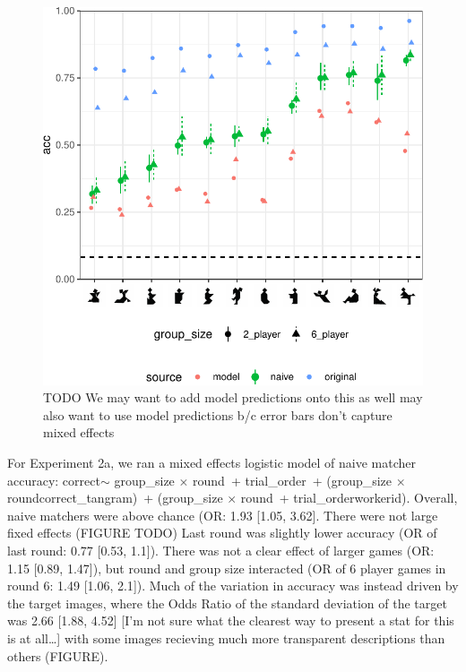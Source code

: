 \documentclass[10pt, letterpaper]{article}
\begin{document}
\begin{CodeChunk}
\begin{figure}[t]

{\centering \includegraphics[width=1\linewidth]{figs/fig-2-1} 

}

\caption[TODO We may want to add model predictions onto this as well may also want to use model predictions b/c error bars don't capture mixed effects \label{TODO2}]{TODO We may want to add model predictions onto this as well may also want to use model predictions b/c error bars don't capture mixed effects \label{TODO2}}\label{fig:fig-2}
\end{figure}
\end{CodeChunk}

For Experiment 2a, we ran a mixed effects logistic model of naive
matcher accuracy: correct\(\sim\) group\_size \(\times\) round~+
trial\_order~+ (group\_size \(\times\) round\textbar correct\_tangram)~+
(group\_size \(\times\) round~+ trial\_order\textbar workerid). Overall,
naive matchers were above chance (OR: 1.93 {[}1.05, 3.62{]}. There were
not large fixed effects (FIGURE TODO) Last round was slightly lower
accuracy (OR of last round: 0.77 {[}0.53, 1.1{]}). There was not a clear
effect of larger games (OR: 1.15 {[}0.89, 1.47{]}), but round and group
size interacted (OR of 6 player games in round 6: 1.49 {[}1.06, 2.1{]}).
Much of the variation in accuracy was instead driven by the target
images, where the Odds Ratio of the standard deviation of the target was
2.66 {[}1.88, 4.52{]} {[}I'm not sure what the clearest way to present a
stat for this is at all\ldots{]} with some images recieving much more
transparent descriptions than others (FIGURE).
\end{document}
